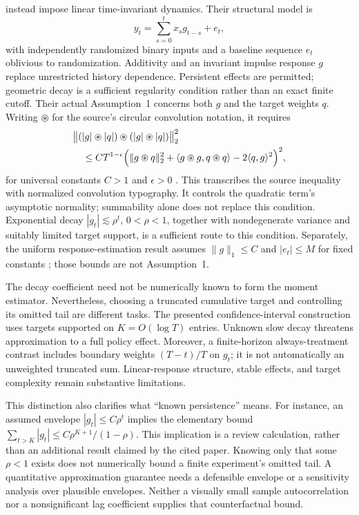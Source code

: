 \citet{liangrecht2025} instead impose linear time-invariant dynamics. Their structural model is
\[
 y_t=\sum_{s=0}^t x_sg_{t-s}+e_t,
\]
with independently randomized binary inputs and a baseline sequence $e_t$ oblivious to randomization. Additivity and an invariant impulse response $g$ replace unrestricted history dependence. Persistent effects are permitted; geometric decay is a sufficient regularity condition rather than an exact finite cutoff. Their actual Assumption~1 concerns both $g$ and the target weights $q$. Writing $\circledast$ for the source's circular convolution notation, it requires
\begin{align}
 &\big\lVert(|g|\circledast|q|)\circledast(|g|\circledast|q|)\big\rVert_2^2\notag\\
 &\quad\leq CT^{1-\epsilon}\Big(\lVert g\circledast q\rVert_2^2
   +\langle g\circledast g,q\circledast q\rangle
   -2\langle q,g\rangle^2\Big)^2,
 \label{eq:liangrecht-normality}
\end{align}
for universal constants $C>1$ and $\epsilon>0$ \citep[Assumption~1, p.~15]{liangrecht2025}. This transcribes the source inequality with normalized convolution typography. It controls the quadratic term's asymptotic normality; summability alone does not replace this condition. Exponential decay $|g_t|\lesssim\rho^t$, $0<\rho<1$, together with nondegenerate variance and suitably limited target support, is a sufficient route to this condition. Separately, the uniform response-estimation result assumes $\lVert g\rVert_1\leq C$ and $|e_t|\leq M$ for fixed constants \citep[Theorem~3, p.~17]{liangrecht2025}; those bounds are not Assumption~1.

The decay coefficient need not be numerically known to form the moment estimator. Nevertheless, choosing a truncated cumulative target and controlling its omitted tail are different tasks. The presented confidence-interval construction uses targets supported on $K=O(\log T)$ entries. Unknown slow decay threatens approximation to a full policy effect. Moreover, a finite-horizon always-treatment contrast includes boundary weights $(T-t)/T$ on $g_t$; it is not automatically an unweighted truncated sum. Linear-response structure, stable effects, and target complexity remain substantive limitations.

This distinction also clarifies what ``known persistence'' means. For instance, an assumed envelope $|g_t|\leq C\rho^t$ implies the elementary bound $\sum_{t>K}|g_t|\leq C\rho^{K+1}/(1-\rho)$. This implication is a review calculation, rather than an additional result claimed by the cited paper. Knowing only that some $\rho<1$ exists does not numerically bound a finite experiment's omitted tail. A quantitative approximation guarantee needs a defensible envelope or a sensitivity analysis over plausible envelopes. Neither a visually small sample autocorrelation nor a nonsignificant lag coefficient supplies that counterfactual bound.

